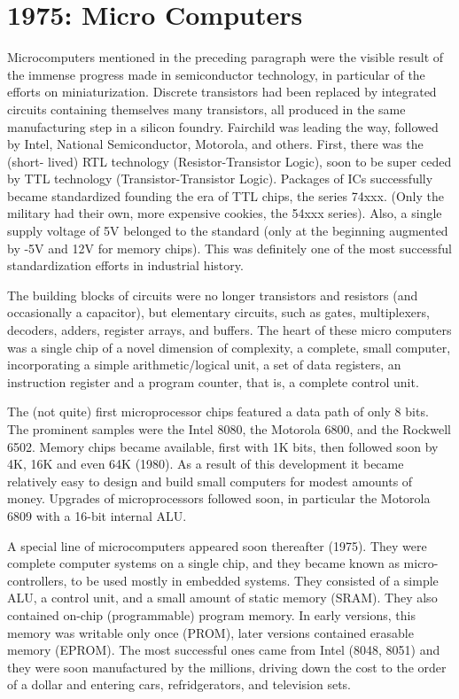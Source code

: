 \section{1975: Micro Computers}
Microcomputers mentioned in the preceding paragraph were the visible result of
the immense progress made in semiconductor technology, in particular of the
efforts on miniaturization. Discrete transistors had been replaced by integrated
circuits containing themselves many transistors, all produced in the same
manufacturing step in a silicon foundry. Fairchild was leading the way, followed by
Intel, National Semiconductor, Motorola, and others. First, there was the (short-
lived) RTL technology (Resistor-Transistor Logic), soon to be super ceded by TTL
technology (Transistor-Transistor Logic). Packages of ICs successfully became
standardized founding the era of TTL chips, the series 74xxx. (Only the military
had their own, more expensive cookies, the 54xxx series). Also, a single supply
voltage of 5V belonged to the standard (only at the beginning augmented by -5V
and 12V for memory chips). This was definitely one of the most successful
standardization efforts in industrial history.

The building blocks of circuits were no longer transistors and resistors (and
occasionally a capacitor), but elementary circuits, such as gates, multiplexers,
decoders, adders, register arrays, and buffers. The heart of these micro computers
was a single chip of a novel dimension of complexity, a complete, small computer,
incorporating a simple arithmetic/logical unit, a set of data registers, an instruction
register and a program counter, that is, a complete control unit.

The (not quite) first microprocessor chips featured a data path of only 8 bits. The
prominent samples were the Intel 8080, the Motorola 6800, and the Rockwell
6502. Memory chips became available, first with 1K bits, then followed soon by 4K,
16K and even 64K (1980). As a result of this development it became relatively
easy to design and build small computers for modest amounts of money. Upgrades
of microprocessors followed soon, in particular the Motorola 6809 with a 16-bit
internal ALU.

A special line of microcomputers appeared soon thereafter (1975). They were
complete computer systems on a single chip, and they became known as micro-
controllers, to be used mostly in embedded systems. They consisted of a simple
ALU, a control unit, and a small amount of static memory (SRAM). They also
contained on-chip (programmable) program memory. In early versions, this
memory was writable only once (PROM), later versions contained erasable
memory (EPROM). The most successful ones came from Intel (8048, 8051) and
they were soon manufactured by the millions, driving down the cost to the order of
a dollar and entering cars, refridgerators, and television sets.
